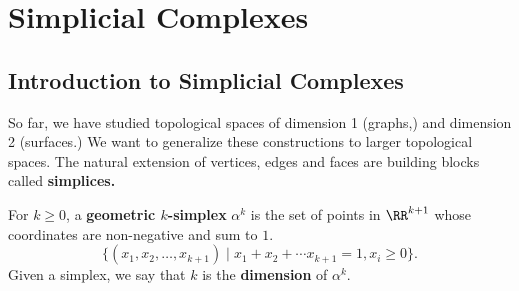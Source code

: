 \chapter{Simplicial Complexes}
\section{Introduction to Simplicial Complexes}
\label{sec:simplicial:simplicial}
So far, we have studied topological spaces of dimension 1 (graphs,) and dimension 2 (surfaces.) We want to generalize these constructions to larger topological spaces. The natural extension of vertices, edges and faces are building blocks called \textbf{simplices.}
\begin{definition}
	For $k\geq 0$,  a \textbf{geometric $k$-simplex} $\alpha^k$ is the set of points in $\RR^{k+1}$ whose coordinates are non-negative and sum to $1$. 
	\[\{(x_1, x_2, \ldots,  x_{k+1})\;| \; x_1+x_2+\cdots x_{k+1}=1,  x_i\geq 0\}.\]
	Given a simplex,  we say that $k$ is the \textbf{dimension} of $\alpha^k$. 
\end{definition}

